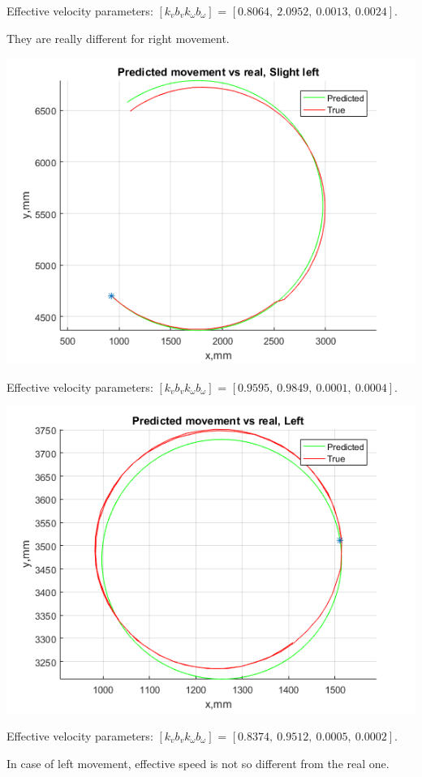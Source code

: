 \documentclass[a4paper, 12pt]{article}
\begin{document}
Effective velocity parameters: $[k_v b_v k_{\omega} b_{\omega}]$ = $[0.8064,~    2.0952,~    0.0013,~    0.0024]$.

They are really different for right movement.

\includegraphics[scale = 0.8]{le.png}

Effective velocity parameters: $[k_v b_v k_{\omega} b_{\omega}]$ = $[0.9595,~    0.9849,~    0.0001,~    0.0004]$.

\includegraphics[scale = 0.8]{lle.png}

Effective velocity parameters: $[k_v b_v k_{\omega} b_{\omega}]$ = $[0.8374,~    0.9512,~    0.0005,~    0.0002]$.

In case of left movement, effective speed is not so different from the real one.
\end{document}
